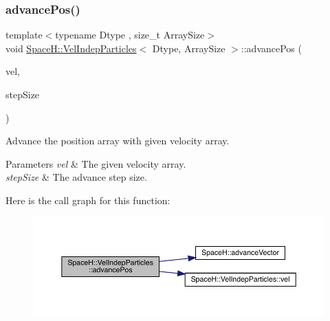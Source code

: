 \subsubsection{\texorpdfstring{advance\+Pos()}{advancePos()}\hspace{0.1cm}{\footnotesize\ttfamily [2/2]}}
{\footnotesize\ttfamily template$<$typename Dtype , size\+\_\+t Array\+Size$>$ \\
void \mbox{\hyperlink{class_space_h_1_1_vel_indep_particles}{Space\+H\+::\+Vel\+Indep\+Particles}}$<$ Dtype, Array\+Size $>$\+::advance\+Pos (\begin{DoxyParamCaption}\item[{const \mbox{\hyperlink{class_space_h_1_1_vel_indep_particles_aa9983058940249df8b00fa800e8cbad2}{Vector\+Array}} \&}]{vel,  }\item[{\mbox{\hyperlink{class_space_h_1_1_vel_indep_particles_aeb47d8131b30ed790320ff634f0d6af1}{Scalar}}}]{step\+Size }\end{DoxyParamCaption})\hspace{0.3cm}{\ttfamily [inline]}}



Advance the position array with given velocity array. 


\begin{DoxyParams}{Parameters}
{\em vel} & The given velocity array. \\
\hline
{\em step\+Size} & The advance step size. \\
\hline
\end{DoxyParams}
Here is the call graph for this function\+:
\nopagebreak
\begin{figure}[H]
\begin{center}
\leavevmode
\includegraphics[width=350pt]{class_space_h_1_1_vel_indep_particles_a75d5a3918dd3ceb323796c425baa3710_cgraph}
\end{center}
\end{figure}
\mbox{\label{class_space_h_1_1_vel_indep_particles_a3d72551854f8623412f0877e7847b4a9}} 
